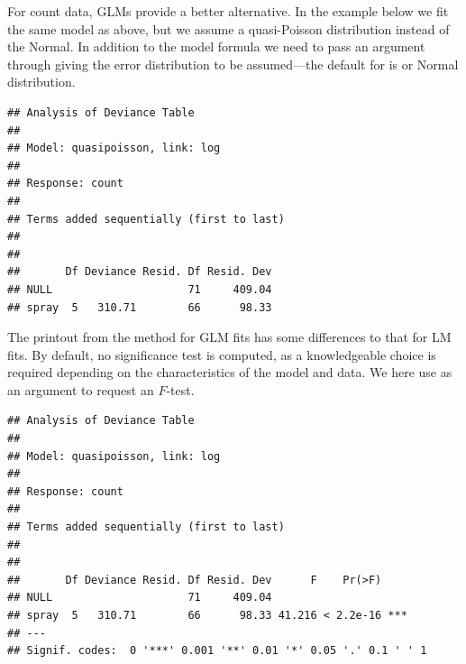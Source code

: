 \documentclass[krantz2]{krantz}\usepackage{knitr}
\begin{document}
For count data, GLMs provide a better alternative. In the example below we fit the same model as above, but we assume a quasi-Poisson distribution instead of the Normal. In addition to the model formula we need to pass an argument through  giving the error distribution to be assumed---the default for  is  or Normal distribution.

\begin{knitrout}\footnotesize
{}\color{fgcolor}\begin{kframe}
\begin{alltt}
 \hlkwb{<-}  \hlopt{~}     
\end{alltt}
\begin{verbatim}
## Analysis of Deviance Table
## 
## Model: quasipoisson, link: log
## 
## Response: count
## 
## Terms added sequentially (first to last)
## 
## 
##       Df Deviance Resid. Df Resid. Dev
## NULL                     71     409.04
## spray  5   310.71        66      98.33
\end{verbatim}
\end{kframe}
\end{knitrout}

The printout from the  method for GLM fits has some differences to that for LM fits. By default, no significance test is computed, as a knowledgeable choice is required depending on the characteristics of the model and data. We here use  as an argument to request an $F$-test.

\begin{knitrout}\footnotesize
{}\color{fgcolor}\begin{kframe}
\begin{alltt}
  \hlstd{=} \hlstd{)}
\end{alltt}
\begin{verbatim}
## Analysis of Deviance Table
## 
## Model: quasipoisson, link: log
## 
## Response: count
## 
## Terms added sequentially (first to last)
## 
## 
##       Df Deviance Resid. Df Resid. Dev      F    Pr(>F)    
## NULL                     71     409.04                     
## spray  5   310.71        66      98.33 41.216 < 2.2e-16 ***
## ---
## Signif. codes:  0 '***' 0.001 '**' 0.01 '*' 0.05 '.' 0.1 ' ' 1
\end{verbatim}
\end{kframe}
\end{knitrout}
\end{document}
